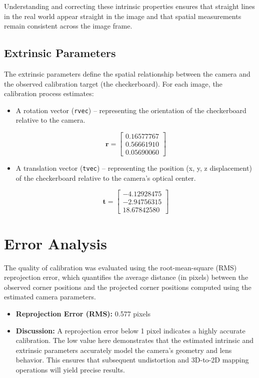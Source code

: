 Understanding and correcting these intrinsic properties ensures that straight lines in the real world appear straight in the image and that spatial measurements remain consistent across the image frame.

\subsection{Extrinsic Parameters}
The extrinsic parameters define the spatial relationship between the camera and the observed calibration target (the checkerboard). For each image, the calibration process estimates:
\begin{itemize}
    \item A rotation vector (\texttt{rvec}) – representing the orientation of the checkerboard relative to the camera.
    
\[
\mathbf{r} =
\begin{bmatrix}
0.16577767 \\
0.56661910 \\
0.05690060
\end{bmatrix}
\]
    
    \item A translation vector (\texttt{tvec}) – representing the position (x, y, z displacement) of the checkerboard relative to the camera’s optical center.
    
\[
\mathbf{t} =
\begin{bmatrix}
-4.12928475 \\
-2.94756315 \\
18.67842580
\end{bmatrix}
\]
    
\end{itemize}

\section{Error Analysis}
The quality of calibration was evaluated using the root-mean-square (RMS) reprojection error, which quantifies the average distance (in pixels) between the observed corner positions and the projected corner positions computed using the estimated camera parameters.

\begin{itemize}
    \item \textbf{Reprojection Error (RMS):} 0.577 pixels
    \item \textbf{Discussion:} A reprojection error below 1 pixel indicates a highly accurate calibration. The low value here demonstrates that the estimated intrinsic and extrinsic parameters accurately model the camera’s geometry and lens behavior. This ensures that subsequent undistortion and 3D-to-2D mapping operations will yield precise results.
\end{itemize}

